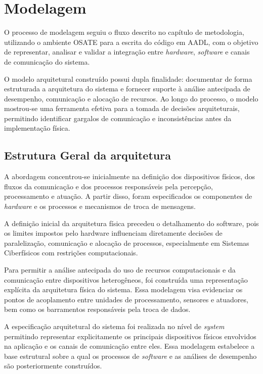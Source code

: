\chapter{Modelagem}

O processo de modelagem seguiu o fluxo descrito no capítulo de metodologia, utilizando o ambiente OSATE para a escrita do código em AADL, com o objetivo de representar, analisar e validar a integração entre \textit{hardware}, \textit{software} e canais de comunicação do sistema. 

O modelo arquitetural construído possui dupla finalidade: documentar de forma estruturada a arquitetura do sistema e fornecer suporte à análise antecipada de desempenho, comunicação e alocação de recursos. Ao longo do processo, o modelo mostrou-se uma ferramenta efetiva para a tomada de decisões arquiteturais, permitindo identificar gargalos de comunicação e inconsistências antes da implementação física.

\section{Estrutura Geral da arquitetura}
A abordagem concentrou-se inicialmente na definição dos dispositivos físicos, dos fluxos da comunicação e dos processos responsáveis pela percepção, processamento e atuação. A partir disso, foram especificados os componentes de \textit{hardware} e os processos e mecanismos de troca de mensagens. 

A definição inicial da arquitetura física precedeu o detalhamento do software, pois os limites impostos pelo hardware influenciam diretamente decisões de paralelização, comunicação e alocação de processos, especialmente em Sistemas Ciberfísicos com restrições computacionais.

Para permitir a análise antecipada do uso de recursos computacionais e da comunicação entre dispositivos heterogêneos, foi construída uma representação explícita da arquitetura física do sistema. Essa modelagem visa evidenciar os pontos de acoplamento entre unidades de processamento, sensores e atuadores, bem como os barramentos responsáveis pela troca de dados.

A especificação arquitetural do sistema foi realizada no nível de \textit{system} permitindo representar explicitamente os principais dispositivos físicos envolvidos na aplicação e os canais de comunicação entre eles. Essa modelagem estabelece a base estrutural sobre a qual os processos de \textit{software} e as análises de desempenho são posteriormente construídos.

